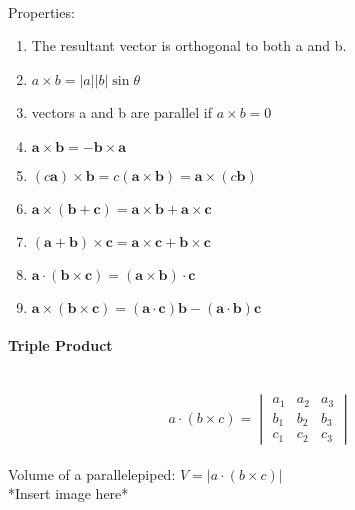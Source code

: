 \documentclass{article}
\begin{document}
\\\\\\
Properties:
\begin{enumerate}
    \item The resultant vector is orthogonal to both a and b.
    \item \(a \times b = |a||b|\sin{\theta}\)
    \item vectors a and b are parallel if \(a \times b = 0\)
    \item \( \mathbf{a} \times \mathbf{b} = -\mathbf{b} \times \mathbf{a} \)
    \item \( (c\mathbf{a}) \times \mathbf{b} = c(\mathbf{a} \times \mathbf{b}) = \mathbf{a} \times (c\mathbf{b}) \)
    \item \( \mathbf{a} \times (\mathbf{b} + \mathbf{c}) = \mathbf{a} \times \mathbf{b} + \mathbf{a} \times \mathbf{c} \)
    \item \( (\mathbf{a} + \mathbf{b}) \times \mathbf{c} = \mathbf{a} \times \mathbf{c} + \mathbf{b} \times \mathbf{c} \)
    \item \( \mathbf{a} \cdot (\mathbf{b} \times \mathbf{c}) = (\mathbf{a} \times \mathbf{b}) \cdot \mathbf{c} \)
    \item \( \mathbf{a} \times (\mathbf{b} \times \mathbf{c}) = (\mathbf{a} \cdot \mathbf{c})\mathbf{b} - (\mathbf{a} \cdot \mathbf{b})\mathbf{c} \)
\end{enumerate}

\paragraph{Triple Product}\mbox{}\\
\begin{equation}
    \label{triple product}
    a \cdot (b \times c) = 
    \begin{vmatrix}
        a_1 & a_2 & a_3\\
        b_1 & b_2 & b_3\\
        c_1 & c_2 & c_3
    \end{vmatrix}
\end{equation}\\
Volume of a parallelepiped: \(V = |a \cdot (b \times c)|\)\\
*Insert image here*\\
\end{document}
